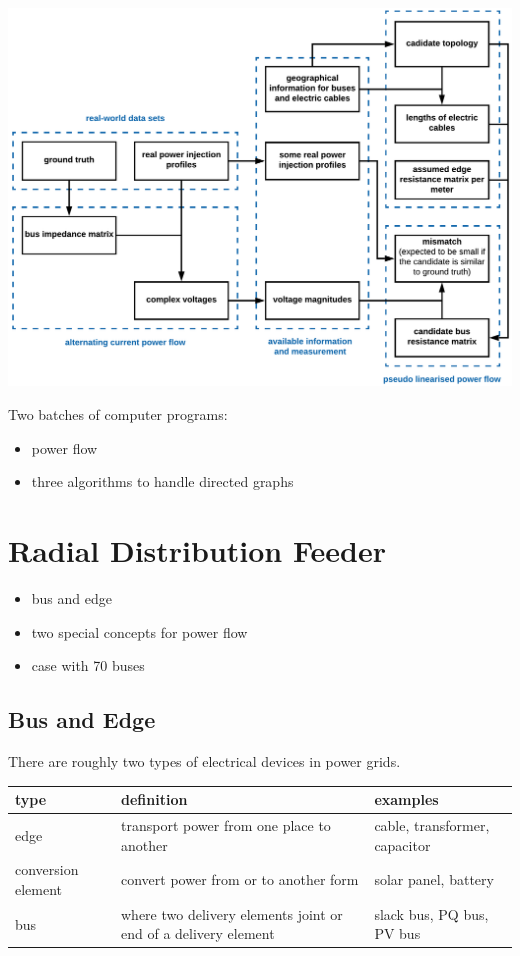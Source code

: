 \documentclass[
]{book}
\providecommand{\tightlist}{%
  \setlength{\itemsep}{0pt}\setlength{\parskip}{0pt}}
\begin{document}
\includegraphics{Pictures/figFlowchart3.png}

Two batches of computer programs:

\begin{itemize}
\tightlist
\item
  power flow
\item
  three algorithms to handle directed graphs
\end{itemize}

\hypertarget{radial-distribution-feeder}{%
\chapter{Radial Distribution Feeder}\label{radial-distribution-feeder}}

\begin{itemize}
\tightlist
\item
  bus and edge
\item
  two special concepts for power flow
\item
  case with 70 buses
\end{itemize}

\hypertarget{bus-edge}{%
\section{Bus and Edge}\label{bus-edge}}

There are roughly two types of electrical devices in power grids.

\begin{table}[H]
\centering
\begin{tabular}[t]{l|l|l}
\hline
type & definition & examples\\
\hline
edge & transport power from one place to another & cable, transformer, capacitor\\
\hline
conversion element & convert power from or to another form & solar panel, battery\\
\hline
bus & where two delivery elements joint or end of a delivery element & slack bus, PQ bus, PV bus\\
\hline
\end{tabular}
\end{table}
\end{document}
